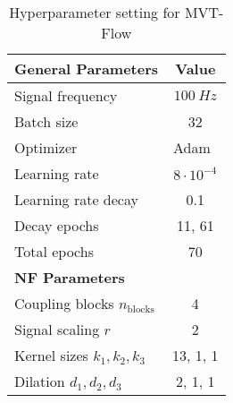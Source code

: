 \documentclass[journal]{IEEEtran}
\begin{document}
\begin{table}[b]
\centering
\begin{tabular}{lc}
\hline
\rowcolor[HTML]{EEEEEE}
\textbf{General Parameters} & Value \\ \hline
Signal frequency & $100~Hz$  \\ \hline 
Batch size & 32  \\ \hline
Optimizer & Adam~\cite{adam} \\ \hline
Learning rate  & $8\cdot 10^{-4}$ \\ \hline 
Learning rate decay & 0.1 \\ \hline
Decay epochs &  11, 61 \\ \hline
Total epochs & 70 \\ \hline
\rowcolor[HTML]{EEEEEE}
\textbf{NF Parameters} &  \\ \hline
Coupling blocks $n_{\mathrm{blocks}}$ & 4 \\ \hline 
Signal scaling $r$ & 2 \\ \hline 
Kernel sizes $k_1, k_2, k_3$ & 13, 1, 1 \\ \hline 
Dilation $d_1, d_2, d_3$ & 2, 1, 1 \\ \hline 
\end{tabular}
\caption{Hyperparameter setting for MVT-Flow}
\label{table:hp}
    \vspace{-3.5mm}
\end{table}
\end{document}
